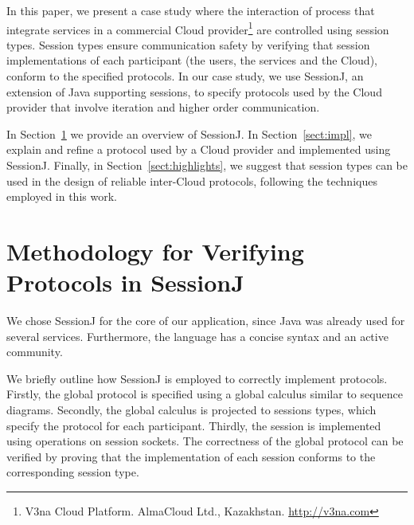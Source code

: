 \documentclass[10pt]{llncs}
\begin{document}
In this paper, we present a case study where the interaction of process that integrate services in a commercial Cloud provider\footnote{V3na Cloud Platform. AlmaCloud Ltd., Kazakhstan. \url{http://v3na.com}} are controlled using session types. Session types ensure communication safety by verifying that session implementations of each participant (the users, the services and the Cloud), conform to the specified protocols. In our case study, we use SessionJ, an extension of Java supporting sessions, to specify protocols used by the Cloud provider that involve iteration and higher order communication.



In Section~\ref{sect:basics} we provide an overview of SessionJ.
In Section~\ref{sect:impl}, we explain and refine a protocol used by a Cloud provider and implemented using SessionJ. %
Finally, in Section~\ref{sect:highlights}, we suggest that session types can be used in the design of reliable inter-Cloud protocols, following the techniques employed in this work.


\section{Methodology for Verifying Protocols in SessionJ}
\label{sect:basics}

We chose SessionJ for the core of our application, since Java was already used for several services. Furthermore, the language has a concise syntax and an active community.

We briefly outline how SessionJ is employed to correctly implement protocols.
Firstly, the global protocol is specified using a global calculus similar to sequence diagrams. Secondly, the global calculus is projected to sessions types, which specify the protocol for each participant.
Thirdly, the session is implemented using operations on session sockets. The correctness of the global protocol can be verified by proving that the implementation of each session conforms to the corresponding session type.
\end{document}
